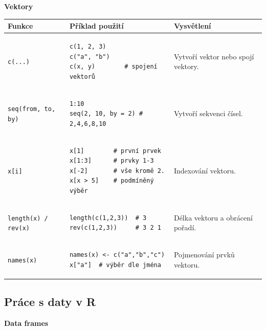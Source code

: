 \documentclass[a4paper, 11pt]{article}
\newenvironment{funkcedict}
{%
  \begingroup
  \renewcommand{\arraystretch}{1.4}%
  \lstset{basicstyle=\ttfamily\small, columns=fullflexible}%
  \setlength{\tabcolsep}{4pt}%
  \begin{tabular}{p{0.19\textwidth} p{0.38\textwidth} p{0.30\textwidth}}
  \textbf{Funkce} & \textbf{Příklad použití} & \textbf{Vysvětlení} \\
  \midrule
}
{%
  \end{tabular}%
  \endgroup
}
\begin{document}
			\medskip\noindent\textbf{Vektory}

			\begin{funkcedict}
				\texttt{c(...)} &
				\begin{lstlisting}
c(1, 2, 3)
c("a", "b")
c(x, y)        # spojení vektorů
				\end{lstlisting}
				& Vytvoří vektor nebo spojí vektory. \\
				\texttt{seq(from, to, by)} &
				\begin{lstlisting}
1:10
seq(2, 10, by = 2) # 2,4,6,8,10
				\end{lstlisting}
				& Vytvoří sekvenci čísel. \\
				\texttt{x[i]} &
				\begin{lstlisting}
x[1]        # první prvek
x[1:3]      # prvky 1-3
x[-2]       # vše kromě 2.
x[x > 5]    # podmíněný výběr
				\end{lstlisting}
				& Indexování vektoru. \\
				\texttt{length(x) / rev(x)} &
				\begin{lstlisting}
length(c(1,2,3))  # 3
rev(c(1,2,3))     # 3 2 1
				\end{lstlisting}
				& Délka vektoru a obrácení pořadí. \\
				\texttt{names(x)} &
				\begin{lstlisting}
names(x) <- c("a","b","c")
x["a"]  # výběr dle jména
				\end{lstlisting}
				& Pojmenování prvků vektoru. \\
			\end{funkcedict}

			\subsection{Práce s daty v R}

			\medskip\noindent\textbf{Data frames}
\end{document}
